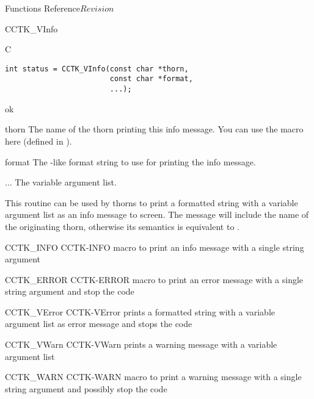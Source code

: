 \begin{cactuspart}{ Functions Reference}{}{$Revision$}
\begin{FunctionDescription}{CCTK\_VInfo}
\begin{SynopsisSection}
\begin{Synopsis}{C}
\begin{verbatim}
int status = CCTK_VInfo(const char *thorn,
                        const char *format,
                        ...);
\end{verbatim}
\end{Synopsis}
\end{SynopsisSection}

\begin{ResultSection}
\begin{Result}{0} ok \end{Result}
\end{ResultSection}

\begin{ParameterSection}
\begin{Parameter}{thorn}
The name of the thorn printing this info message. You can use the
 macro here (defined in ).
\end{Parameter}
\begin{Parameter}{format}
The -like format string to use for printing the info message.
\end{Parameter}
\begin{Parameter}{...}
The variable argument list.
\end{Parameter}
\end{ParameterSection}

\begin{Discussion}
This routine can be used by thorns to print a formatted string with a variable
argument list as an info message to screen.
The message will include the name of the originating thorn, otherwise its
semantics is equivalent to .
\end{Discussion}

\begin{SeeAlsoSection}
\begin{SeeAlso2} {CCTK\_INFO} {CCTK-INFO}
macro to print an info message with a single string argument
\end{SeeAlso2}
\begin{SeeAlso2} {CCTK\_ERROR} {CCTK-ERROR}
macro to print an error message with a single string argument and stop
the code
\end{SeeAlso2}
\begin{SeeAlso2} {CCTK\_VError} {CCTK-VError}
prints a formatted string with a variable argument list as error
message and stops the code
\end{SeeAlso2}
\begin{SeeAlso2} {CCTK\_VWarn} {CCTK-VWarn}
prints a warning message with a variable argument list
\end{SeeAlso2}
\begin{SeeAlso2} {CCTK\_WARN} {CCTK-WARN}
macro to print a warning message with a single string argument and
possibly stop the code
\end{SeeAlso2}
\end{SeeAlsoSection}


\end{FunctionDescription}
\end{cactuspart}
